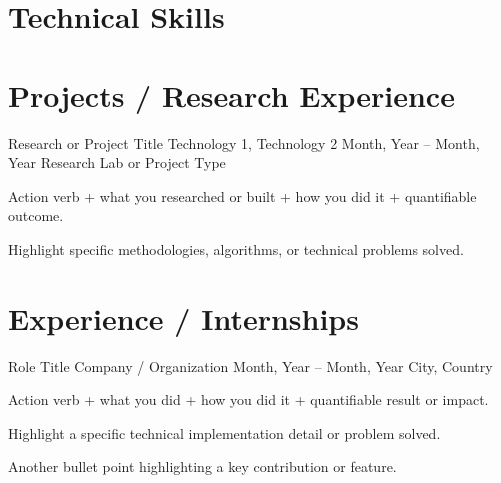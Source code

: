 \documentclass[11pt, a4paper]{article}
\begin{document}

\section{Technical Skills}


\section{Projects / Research Experience}
\cvProject
    {Research or Project Title}
    {Technology 1, Technology 2}
    {Month, Year – Month, Year}
    {Research Lab or Project Type}
    {
        \item Action verb + what you researched or built + how you did it + quantifiable outcome.
        \item Highlight specific methodologies, algorithms, or technical problems solved.
    }


\section{Experience / Internships}
\cvExperience
    {Role Title}
    {Company / Organization}
    {Month, Year – Month, Year}
    {City, Country}
    {
        \item Action verb + what you did + how you did it + quantifiable result or impact.
        \item Highlight a specific technical implementation detail or problem solved.
        \item Another bullet point highlighting a key contribution or feature.
    }
\end{document}
